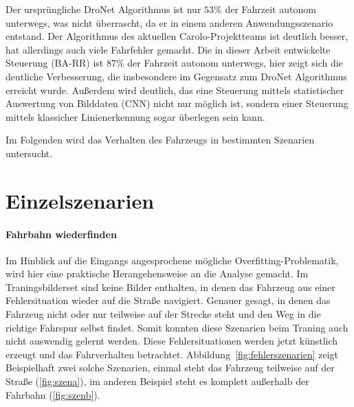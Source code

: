Der ursprüngliche DroNet Algorithmus ist nur $53 \%$ der Fahrzeit autonom unterwegs, was nicht überrascht, da er in einem anderen Anwendungsszenario entstand. Der Algorithmus des aktuellen Carolo-Projektteams ist deutlich besser, hat allerdings auch viele Fahrfehler gemacht. Die in dieser Arbeit entwickelte Steuerung (BA-RR) ist $87 \%$ der Fahrzeit autonom unterwegs, hier zeigt sich die deutliche Verbesserung, die insbesondere im Gegensatz zum DroNet Algorithmus erreicht wurde. Außerdem wird deutlich, das eine Steuerung mittels statistischer Auswertung von Bilddaten (CNN) nicht nur möglich ist, sondern einer Steuerung mittels klassicher Linienerkennung sogar überlegen sein kann. 

Im Folgenden wird das Verhalten des Fahrzeugs in bestimmten Szenarien untersucht.

\section{Einzelszenarien}

\paragraph{Fahrbahn wiederfinden}
Im Hinblick auf die Eingangs angesprochene mögliche Overfitting-Problematik, wird hier eine praktische Herangehensweise an die Analyse gemacht.
Im Traningsbilderset sind keine Bilder enthalten, in denen das Fahrzeug aus einer Fehlersituation wieder auf die Straße navigiert. Genauer gesagt, in denen das Fahrzeug nicht oder nur teilweise auf der Strecke steht und den Weg in die richtige Fahrspur selbst findet. Somit konnten diese Szenarien beim Traning auch nicht \glqq auswendig \grqq{} gelernt werden. Diese Fehlersituationen werden jetzt künstlich erzeugt und das Fahrverhalten betrachtet.
Abbildung~\ref{fig:fehlerszenarien} zeigt Beispielhaft zwei solche Szenarien, einmal steht das Fahrzeug teilweise auf der Straße (\ref{fig:szena}), im anderen Beispiel steht es komplett außerhalb der Fahrbahn (\ref{fig:szenb}).


